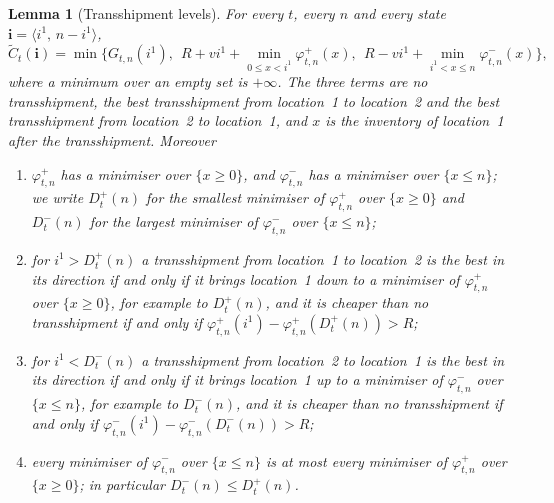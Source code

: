 \documentclass[11pt]{article}
\renewcommand{\vec}[1]{\boldsymbol{#1}}
\newcommand{\Ct}{\widetilde{C}}
\newtheorem{lemma}{Lemma}
\theoremstyle{definition}
\begin{document}
\begin{lemma}[Transshipment levels]\label{lem:line}
For every $t$, every $n$ and every state $\vec{i}=\langle i^1,\,n-i^1\rangle$,
\begin{equation}\label{eq:line}
\Ct_t(\vec{i})=\min\Big\{G_{t,n}(i^1),\ \ R+vi^1+\min_{0\le x<i^1}\varphi^+_{t,n}(x),\ \ R-vi^1+\min_{i^1<x\le n}\varphi^-_{t,n}(x)\Big\},
\end{equation}
where a minimum over an empty set is $+\infty$. The three terms are no transshipment, the best transshipment from location~1 to location~2 and the best transshipment from location~2 to location~1, and $x$ is the inventory of location~1 after the transshipment. Moreover
\begin{enumerate}[label=(\roman*)]
\item $\varphi^+_{t,n}$ has a minimiser over $\{x\ge0\}$, and $\varphi^-_{t,n}$ has a minimiser over $\{x\le n\}$; we write $D^+_t(n)$ for the smallest minimiser of $\varphi^+_{t,n}$ over $\{x\ge0\}$ and $D^-_t(n)$ for the largest minimiser of $\varphi^-_{t,n}$ over $\{x\le n\}$;
\item for $i^1>D^+_t(n)$ a transshipment from location~1 to location~2 is the best in its direction if and only if it brings location~1 down to a minimiser of $\varphi^+_{t,n}$ over $\{x\ge0\}$, for example to $D^+_t(n)$, and it is cheaper than no transshipment if and only if $\varphi^+_{t,n}(i^1)-\varphi^+_{t,n}(D^+_t(n))>R$;
\item for $i^1<D^-_t(n)$ a transshipment from location~2 to location~1 is the best in its direction if and only if it brings location~1 up to a minimiser of $\varphi^-_{t,n}$ over $\{x\le n\}$, for example to $D^-_t(n)$, and it is cheaper than no transshipment if and only if $\varphi^-_{t,n}(i^1)-\varphi^-_{t,n}(D^-_t(n))>R$;
\item every minimiser of $\varphi^-_{t,n}$ over $\{x\le n\}$ is at most every minimiser of $\varphi^+_{t,n}$ over $\{x\ge0\}$; in particular $D^-_t(n)\le D^+_t(n)$.
\end{enumerate}
\end{lemma}
\end{document}
